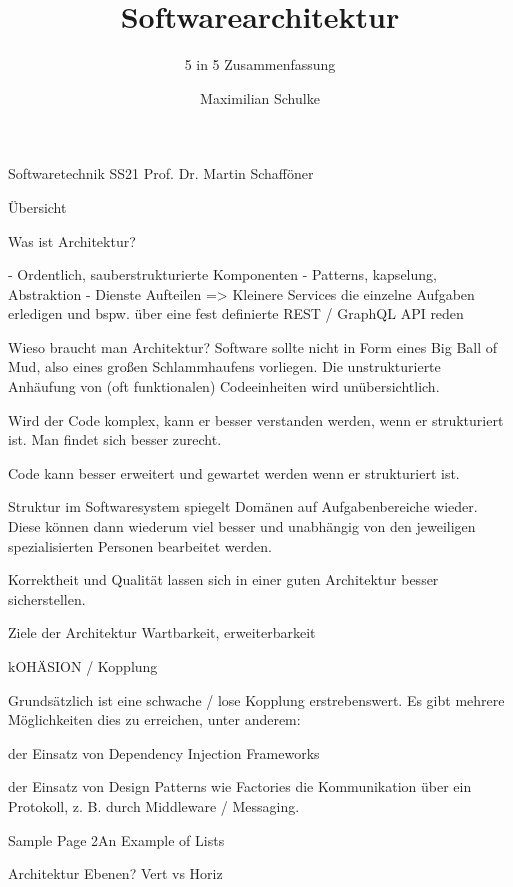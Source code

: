 \documentclass{beamer}
\title{Softwarearchitektur}
\subtitle{5 in 5 Zusammenfassung}
\author{Maximilian Schulke}
\begin{document}
\begin{frame}
	Softwaretechnik \hfill SS21
	\titlepage
	Prof. Dr. Martin Schafföner
\end{frame}

\begin{frame}{Übersicht}
	\tableofcontents
\end{frame}

\begin{frame}{Was ist Architektur?}

	- Ordentlich, sauberstrukturierte Komponenten
	- Patterns, kapselung, Abstraktion
	- Dienste Aufteilen => Kleinere Services die einzelne Aufgaben erledigen und bspw. über eine fest definierte REST / GraphQL API reden
\end{frame}

\begin{frame}{Wieso braucht man Architektur?}
	Software sollte nicht in Form eines Big Ball of Mud, also eines großen Schlammhaufens vorliegen.
	Die unstrukturierte Anhäufung von (oft funktionalen) Codeeinheiten wird unübersichtlich.

	Wird der Code komplex, kann er besser verstanden werden, wenn er strukturiert ist. Man findet sich besser zurecht.

	Code kann besser erweitert und gewartet werden wenn er strukturiert ist.

	Struktur im Softwaresystem spiegelt Domänen auf Aufgabenbereiche wieder. Diese können dann wiederum viel besser und unabhängig von den jeweiligen spezialisierten Personen bearbeitet werden.

	Korrektheit und Qualität lassen sich in einer guten Architektur besser sicherstellen.
\end{frame}

\begin{frame}{Ziele der Architektur}
	Wartbarkeit, erweiterbarkeit

	kOHÄSION / Kopplung

	Grundsätzlich ist eine schwache / lose Kopplung erstrebenswert. Es gibt mehrere Möglichkeiten dies zu erreichen, unter anderem:

	der Einsatz von Dependency Injection Frameworks

	der Einsatz von Design Patterns wie Factories
	die Kommunikation über ein Protokoll, z. B. durch Middleware / Messaging.
\end{frame}

\begin{frame}{Sample Page 2}{An Example of Lists}

	Architektur Ebenen? Vert vs Horiz
\end{frame}
\end{document}
